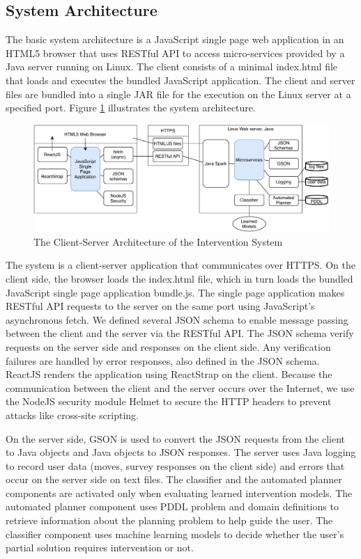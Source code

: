 \documentclass[doctor]{thesis} %
\theoremstyle{plain}
\begin{document}
\subsection*{System Architecture}
The basic system architecture is a JavaScript single page web application in an HTML5 browser that uses RESTful API to access micro-services provided by a Java server running on Linux. The client consists of a minimal index.html file that loads and executes the bundled JavaScript application. The client and server files are bundled into a single JAR file for the execution on the Linux server at a specified port. Figure \ref{fig:architecture} illustrates the system architecture.

\begin{figure}[!ht]
  \centering
\includegraphics[width=\columnwidth]{img/architecture.pdf}
  \caption{The Client-Server Architecture of the Intervention System}
  \label{fig:architecture}
\end{figure}
The system is a client-server application that communicates over HTTPS. On the client side, the browser loads the index.html file, which in turn loads the bundled JavaScript single page application bundle.js. The single page application makes RESTful API requests to the server on the same port using JavaScript's asynchronous fetch. We defined several JSON schema to enable message passing between the client and the server via the RESTful API. The JSON schema verify requests on the server side and responses on the client side. Any verification failures are handled by error responses, also defined in the JSON schema. ReactJS renders the application using ReactStrap on the client. Because the communication between the client and the server occurs over the Internet, we use the NodeJS security module Helmet to secure the HTTP headers to prevent attacks like cross-site scripting.

On the server side, GSON is used to convert the JSON requests from the client to Java objects and Java objects to JSON responses. The server uses Java logging to record user data (moves, survey responses on the client side) and errors that occur on the server side on text files. The classifier and the automated planner components are activated only when evaluating learned intervention models. The automated planner component uses PDDL problem and domain definitions to retrieve information about the planning problem to help guide the user. The classifier component uses machine learning models to decide whether the user's partial solution requires intervention or not.
\end{document}
